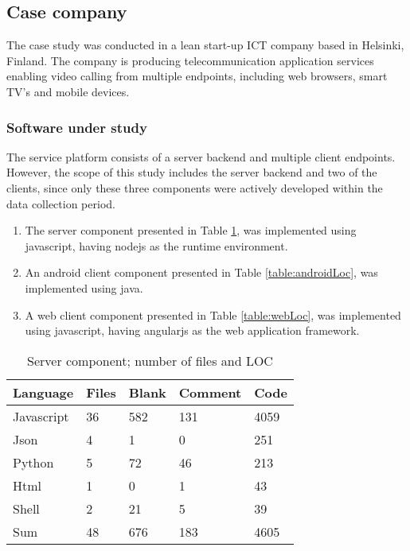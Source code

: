 \subsection{Case company} \label{caseCompany}
The case study was conducted in a lean start-up ICT company based in Helsinki, Finland. The company is producing  telecommunication application services enabling video calling from multiple endpoints, including web browsers, smart TV's and mobile devices. 
\subsubsection*{Software under study} \label{software}
The service platform consists of a server backend and multiple client endpoints. However, the scope of this study includes the server backend and two of the clients, since only these three components were actively developed within the data collection period. 

\begin{enumerate}[label=\textbf{C\arabic*}]
\item The server component presented in Table \ref{table:serverLoc}, was implemented using javascript, having nodejs as the runtime environment.

\item An android client component presented in Table \ref{table:androidLoc}, was implemented using java.
    
\item A web client component presented in Table \ref{table:webLoc}, was implemented using javascript, having angularjs as the web application framework.
\end{enumerate}

\begin{table}[ht!]
\centering
\caption{Server component; number of files and \gls{LOC}}
\label{table:serverLoc}
    \begin{tabular}{ |p{3cm} p{2cm} p{2cm} p{2cm} p{2cm}|  }
     \hline
     Language       &Files  &Blank  &Comment    &Code\\
     \hline
     \hline
     Javascript     &36     &582    &131        &4059\\
     Json           &4      &1      &0          &251\\
     Python         &5      &72     &46         &213\\
     Html           &1      &0      &1          &43\\
     Shell          &2      &21     &5          &39\\
     \hline\hline
     Sum            &48     &676    &183        &4605\\
     \hline
    \end{tabular}
\end{table}

